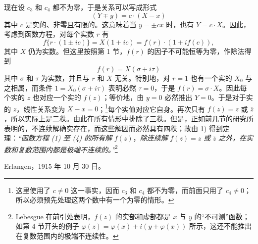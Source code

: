 现在设 $c_3$ 和 $c_4$ 都不为零，于是关系可以写成形式
\[
(Y\mp y)=c\cdot(X-x)
\]
其中 $c$ 是实的、非零且有限的。这意味着当 $y=\pm cx$ 时，也有 $Y=c\cdot X$。因此，考虑到函数方程，对每个实数 $r$ 有
\[
f\{r\cdot(1\pm ic)\}=X(1+ic)=f(r)\cdot(1+i f(c)),
\]
其中 $X$ 仍为实数。但这里按照第 1 节，$f(r)$ 的因子不可能恒等为零，作除法得到
\[
f(r)=X(\sigma+i\tau)
\]
其中 $\sigma$ 和 $\tau$ 为实数，并且与 $r$ 和 $X$ 无关。特别地，对 $r=1$ 也有一个实的 $X_0$ 与之相属，而条件 $1=X_0(\sigma+i\tau)$ 表明必然 $\tau=0$，于是 $f(r)=\sigma\cdot X$。因此每个实的 $z$ 也对应一个实的 $f(z)$；等价地，由 $y=0$ 必然推出 $Y=0$。于是对于实的 $z$，线性关系变为 $X-x=0$；\footnote{这里使用了 $c\ne0$ 这一事实，因而 $c_3$ 和 $c_4$ 都不为零，而前面只用了 $c_4\ne0$；所以必须预先处理这两个数中有一个为零的情形。}每个实值对应它自身。再次只有 $f(z)=z$ 或 $\overline z$，所以实际上是二秩。由此在所有情形中排除了三秩。但是，正如前几节的研究所表明的，不连续解确实存在，而这些解因而必然具有四秩；故由 1) 得到定理：\emph{“函数方程 (1) 至 (4) 的所有解} $f(z)$，\emph{除连续解} $f(z)=z$ \emph{或} $\overline z$ \emph{之外，在实数和复数范围内都是极端不连续的。”}\footnote{Lebesgue 在前引处表明，$f(z)$ 的实部和虚部都是 $x$ 与 $y$ 的“不可测”函数；如第 4 节开头的例子 $\varphi(z)=\varphi(x)+i(y+\varphi(x))$ 所示，这还不能推出在复数范围内的极端不连续性。}

\medskip
\noindent Erlangen，1915 年 10 月 30 日。
